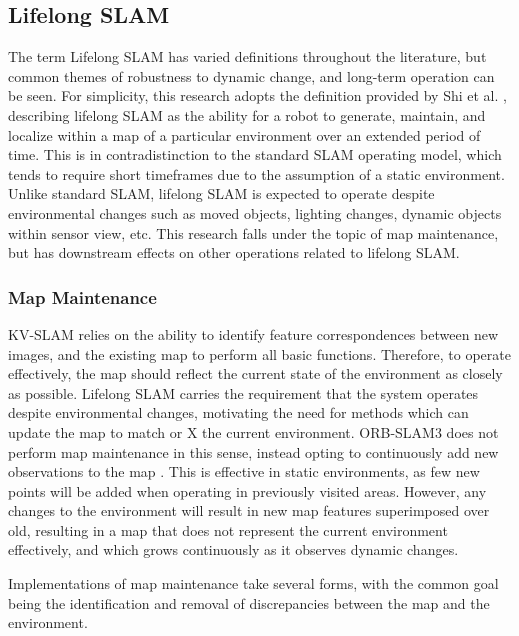 \subsection{Lifelong SLAM}

The term Lifelong SLAM has varied definitions throughout the literature, but common themes of robustness to dynamic change, and long-term operation can be seen. For simplicity, this research adopts the definition provided by Shi et al. \cite{shiAreWeReady2020}, describing lifelong SLAM as the ability for a robot to generate, maintain, and localize within a map of a particular environment over an extended period of time. This is in contradistinction to the standard SLAM operating model, which tends to require short timeframes due to the assumption of a static environment. Unlike standard SLAM, lifelong SLAM is expected to operate despite environmental changes such as moved objects, lighting changes, dynamic objects within sensor view, etc. This research falls under the topic of map maintenance, but has downstream effects on other operations related to lifelong SLAM.

\subsubsection{Map Maintenance}

KV-SLAM relies on the ability to identify feature correspondences between new images, and the existing map to perform all basic functions. Therefore, to operate effectively, the map should reflect the current state of the environment as closely as possible. Lifelong SLAM carries the requirement that the system operates despite environmental changes, motivating the need for methods which can update the map to match or X the current environment. ORB-SLAM3 does not perform map maintenance in this sense, instead opting to continuously add new observations to the map \cite{camposORBSLAM3AccurateOpenSource2021}. This is effective in static environments, as few new points will be added when operating in previously visited areas. However, any changes to the environment will result in new map features superimposed over old, resulting in a map that does not represent the current environment effectively, and which grows continuously as it observes dynamic changes.

Implementations of map maintenance take several forms, with the common goal being the identification and removal of discrepancies between the map and the environment.

\subsubsection{}